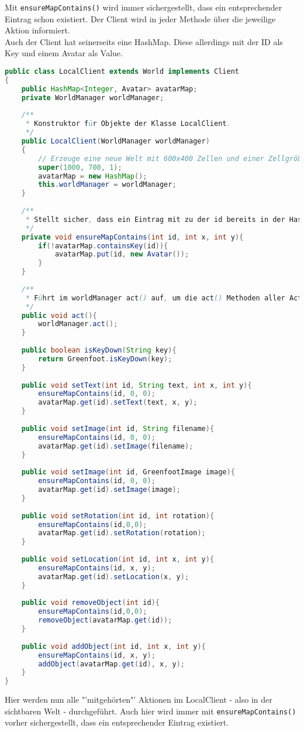 \documentclass{pi1}
\begin{document}
Mit \texttt{ensureMapContains()} wird immer sichergestellt, dass ein entsprechender Eintrag schon existiert. Der Client wird in jeder Methode über die jeweilige Aktion informiert.\\
Auch der Client hat seinerseits eine HashMap. Diese allerdings mit der ID als Key und einem Avatar als Value.

\begin{lstlisting}[caption={}, firstnumber=9, language=Java]
public class LocalClient extends World implements Client
{
    public HashMap<Integer, Avatar> avatarMap;
    private WorldManager worldManager;
    
    /**
     * Konstruktor für Objekte der Klasse LocalClient.
     */
    public LocalClient(WorldManager worldManager)
    {    
        // Erzeuge eine neue Welt mit 600x400 Zellen und einer Zellgröße von 1x1 Pixeln.
        super(1000, 700, 1);
        avatarMap = new HashMap();
        this.worldManager = worldManager;
    }
    
    /**
     * Stellt sicher, dass ein Eintrag mit zu der id bereits in der HashMap existiert.
     */
    private void ensureMapContains(int id, int x, int y){
        if(!avatarMap.containsKey(id)){
            avatarMap.put(id, new Avatar());
        }
    }
    
    /**
     * Führt im worldManager act() auf, um die act() Methoden aller Actors aller Welten auszuführen.
     */
    public void act(){
        worldManager.act();
    }
    
    public boolean isKeyDown(String key){
        return Greenfoot.isKeyDown(key);
    }
    
    public void setText(int id, String text, int x, int y){
        ensureMapContains(id, 0, 0);
        avatarMap.get(id).setText(text, x, y);
    }
    
    public void setImage(int id, String filename){
        ensureMapContains(id, 0, 0);
        avatarMap.get(id).setImage(filename);
    }
    
    public void setImage(int id, GreenfootImage image){
        ensureMapContains(id, 0, 0);
        avatarMap.get(id).setImage(image);
    }
    
    public void setRotation(int id, int rotation){
        ensureMapContains(id,0,0);
        avatarMap.get(id).setRotation(rotation);
    }
    
    public void setLocation(int id, int x, int y){
        ensureMapContains(id, x, y);
        avatarMap.get(id).setLocation(x, y);
    }
    
    public void removeObject(int id){
        ensureMapContains(id,0,0);
        removeObject(avatarMap.get(id));
    }
    
    public void addObject(int id, int x, int y){
        ensureMapContains(id, x, y);
        addObject(avatarMap.get(id), x, y);
    }
}
\end{lstlisting}
Hier werden nun alle "'mitgehörten"' Aktionen im LocalClient - also in der sichtbaren Welt - durchgeführt. Auch hier wird immer mit \texttt{ensureMapContains()} vorher sichergestellt, dass ein entsprechender Eintrag existiert.
\end{document}
